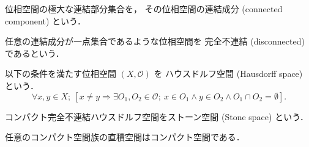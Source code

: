 \documentclass[titlepage]{ltjsreport}
\begin{document}
\begin{definition}[連結成分]
  位相空間の極大な連結部分集合を，
  その位相空間の連結成分 (connected component) という．
\end{definition}

\begin{definition}[完全不連結]
  任意の連結成分が一点集合であるような位相空間を
  完全不連結 (disconnected) であるという．
\end{definition}

\begin{definition}[ハウスドルフ空間]
  以下の条件を満たす位相空間 $(X,\mathcal{O})$ を
  ハウスドルフ空間 (Hausdorff space) という．
  \begin{equation}
    \forall x,y\in X;
    \ \left[x\neq y\Longrightarrow\exists O_1,O_2\in\mathcal{O};
      \ x\in O_1\wedge y\in O_2\wedge O_1\cap O_2=\emptyset\right].
  \end{equation}
\end{definition}

\begin{definition}[ストーン空間]\label{def:stone-space}
  コンパクト完全不連結ハウスドルフ空間をストーン空間 (Stone space) という．
\end{definition}

\begin{theorem}[チコノフの定理]
  任意のコンパクト空間族の直積空間はコンパクト空間である．
\end{theorem}
\end{document}

